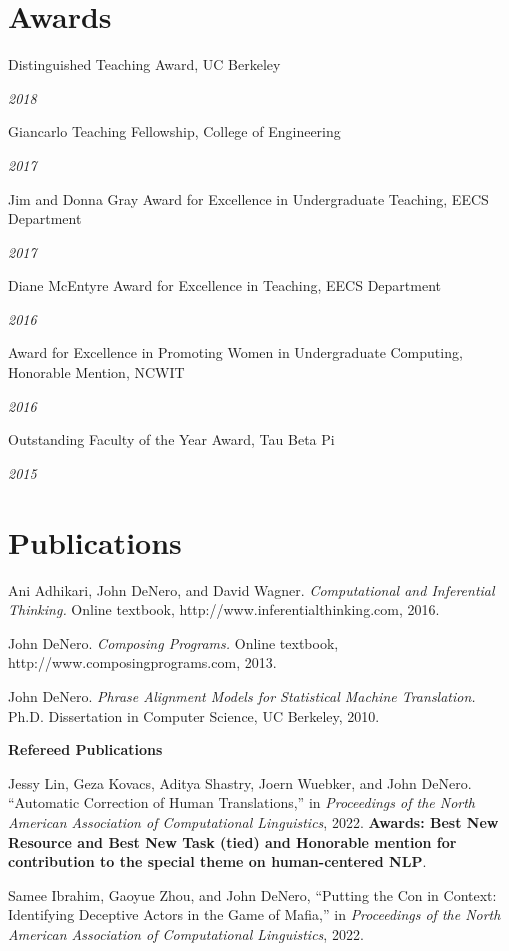 \documentclass[margin,line]{res}
\newcommand{\dated}[2]{\parbox[t]{4.4in}{#1} \hspace{0.4in}
											 \parbox[t]{1in}{ {\it #2 } } }
\begin{document}
\begin{resume}
\section{\sc Awards}

\dated{Distinguished Teaching Award, UC Berkeley} { 2018 }

\dated{Giancarlo Teaching Fellowship, College of Engineering} { 2017 }

\dated{Jim and Donna Gray Award for Excellence in Undergraduate Teaching, EECS Department} { 2017 }

\dated{Diane McEntyre Award for Excellence in Teaching, EECS Department} { 2016 }

\dated{Award for Excellence in Promoting Women in Undergraduate Computing, Honorable Mention, NCWIT} { 2016 }

%
\dated{Outstanding Faculty of the Year Award, Tau Beta Pi} { 2015 }

%
%
%

\section{\sc Publications}

Ani Adhikari, John DeNero, and David Wagner. {\it Computational and
Inferential Thinking.} Online textbook, http://www.inferentialthinking.com,
2016.

John DeNero. {\it Composing Programs.} Online textbook,
http://www.composingprograms.com, 2013.

John DeNero. {\it Phrase Alignment Models for Statistical Machine Translation.}
Ph.D. Dissertation in Computer Science, UC Berkeley, 2010.

{\bf Refereed Publications }

Jessy Lin, Geza Kovacs, Aditya Shastry, Joern Wuebker, and John DeNero. ``Automatic Correction of Human Translations,'' in {\it Proceedings of the North American Association of Computational Linguistics}, 2022. \textbf{Awards: Best New Resource and Best New Task (tied) and Honorable mention for contribution to the special theme on human-centered NLP}.

Samee Ibrahim, Gaoyue Zhou, and John DeNero, ``Putting the Con in Context: Identifying Deceptive Actors in the Game of Mafia,'' in {\it Proceedings of the North American Association of Computational Linguistics}, 2022.


\end{resume}
\end{document}
